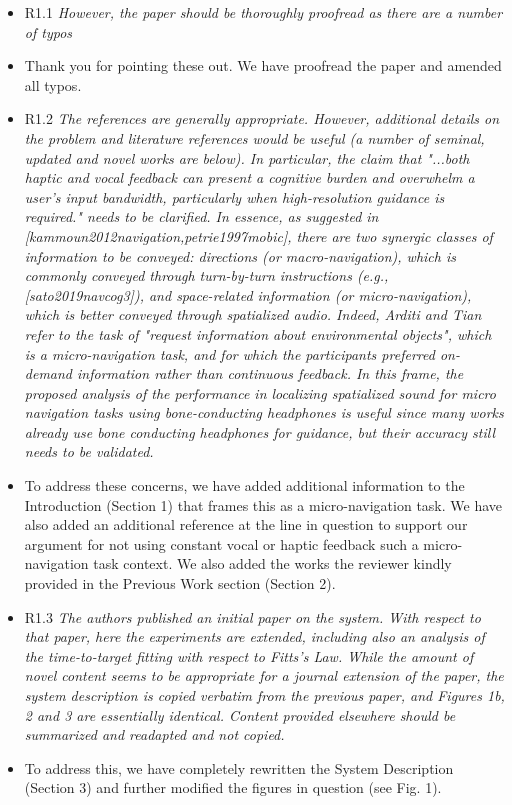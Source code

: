 \documentclass{scrartcl}
\begin{document}
\begin{itemize}
  \item R1.1 \textit{However, the paper should be thoroughly proofread as there are a number of typos}
  \item[] Thank you for pointing these out. We have proofread the paper and amended all typos.

  \item R1.2 \textit{The references are generally appropriate. However, additional details on the problem and literature references would be useful (a number of seminal, updated and novel works are below). In particular, the claim that "...both haptic and vocal feedback can present a cognitive burden and overwhelm a user’s input bandwidth, particularly when high-resolution guidance is required." needs to be clarified.
      In essence, as suggested in [kammoun2012navigation,petrie1997mobic], there are two synergic classes of information to be conveyed: directions (or macro-navigation), which is commonly conveyed through turn-by-turn instructions (e.g., [sato2019navcog3]), and space-related information (or micro-navigation), which is better conveyed through spatialized audio.
      Indeed, Arditi and Tian refer to the task of "request information about environmental objects", which is a micro-navigation task, and for which the participants preferred on-demand information rather than continuous feedback.
In this frame, the proposed analysis of the performance in localizing spatialized sound for micro navigation tasks using bone-conducting headphones is useful since many works already use bone conducting headphones for guidance, but their accuracy still needs to be validated.
}
  \item[] To address these concerns, we have added additional information to the Introduction (Section 1) that frames this as a micro-navigation task.
    We have also added an additional reference at the line in question to support our argument for not using constant vocal or haptic feedback such a micro-navigation task context.
    We also added the works the reviewer kindly provided in the Previous Work section (Section 2).

  \item R1.3 \textit{The authors published an initial paper on the system. With respect to that paper, here the experiments are extended, including also an analysis of the time-to-target fitting with respect to Fitts's Law.
    While the amount of novel content seems to be appropriate for a journal extension of the paper, the system description is copied verbatim from the previous paper, and Figures 1b, 2 and 3 are essentially identical. Content provided elsewhere should be summarized and readapted and not copied.}
  \item[] To address this, we have completely rewritten the System Description (Section 3) and further modified the figures in question (see Fig. 1).


\end{itemize}
\end{document}
